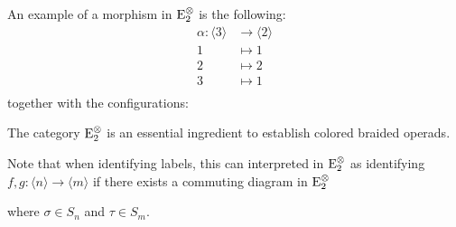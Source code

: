 \begin{eg}
    An example of a morphism in $\operatorname{\operatorname{E}_2^{\otimes}}$ is the following:
    \begin{align*}
        \alpha \colon \langle 3 \rangle &\to \langle 2 \rangle \\ 1 &\mapsto 1 \\
        2 &\mapsto 2 \\
        3 &\mapsto 1 \\
    \end{align*}
    together with the configurations:
    \begin{center}
    \end{center}
\end{eg}
The category $\operatorname{\operatorname{E}_2^{\otimes}}$ is an essential ingredient to establish colored braided
operads.

Note that when identifying labels, this can interpreted
in $\operatorname{\operatorname{E}_2^{\otimes}}$ as identifying $f, g \colon \langle n \rangle \to \langle m \rangle$
if there exists a commuting diagram in $\operatorname{\operatorname{E}_2^{\otimes}}$
\begin{center}
\end{center}
where $\sigma \in S_n$ and $\tau \in S_m$.


